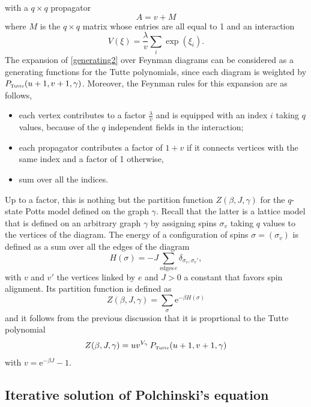 \documentclass[10pt,here,feynmf]{article}
\begin{document}
with a $q\times q$ propagator
\begin{equation}
A=v+M
\end{equation}
where $M$ is the $q\times q$ matrix whose entries are all equal to 1 and an interaction
\begin{equation}
V(\xi)=\frac{\lambda}{v}\sum_{i}\exp(\xi_{i}).
\end{equation}
The expansion of \eqref{generating2} over Feynman diagrams can be considered as a generating functions for the Tutte polynomials, since each diagram is weighted by $P_{\mbox{\tiny Tutte}}(u+1,v+1,\gamma)$. Moreover, the Feynman rules for this expansion are as follows,  
\begin{itemize}
\item
each vertex contributes to a factor $\frac{\lambda}{v}$ and is equipped with an index $i$ taking $q$ values, because of the $q$ independent fields in the interaction; 
\item
each propagator contributes a factor of $1+v$ if it connects vertices with the same index and a factor of 1 otherwise,
\item
sum over all the indices. 
\end{itemize}
Up to a factor, this is  nothing but the partition function $Z(\beta,J,\gamma)$ for the $q$-state Potts model defined on the graph $\gamma$. Recall that the latter is a lattice model that is defined on an arbitrary graph $\gamma$ by assigning spins $\sigma_{v}$ taking $q$ values to the vertices of the diagram. The energy of a configuration of spins $\sigma=(\sigma_{v})$ is defined as a sum over all the edges of the diagram 
\begin{equation}
H(\sigma)=-J\sum_{\mathrm{edges}\,e}\delta_{\sigma_{v},\sigma_{v}'},
\end{equation} 
with $v$ and $v'$ the vertices linked by $e$ and $J>0$ a constant that favors spin alignment. Its partition function is defined as
\begin{equation}
Z(\beta,J,\gamma)=\sum_{\sigma}\mathrm{e}^{-\beta H(\sigma)}
\end{equation}
and it follows from the previous discussion that it is proprtional to the Tutte polynomial 
\begin{equation}
Z(\beta,J,\gamma)=uv^{V_\gamma}\,P_{\mbox{\tiny Tutte}}(u+1,v+1,\gamma)
\end{equation}
with $v=\mathrm{e}^{-\beta J}-1$.

 


\subsection{Iterative solution of Polchinski's equation}
\label{polchsec}
\end{document}
